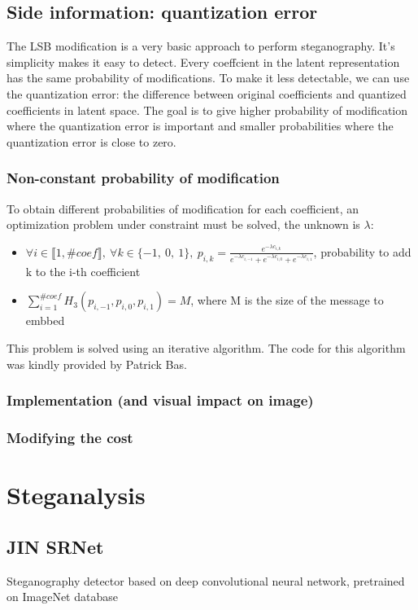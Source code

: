 \documentclass[12pt]{article}
\begin{document}
\subsection{Side information: quantization error}
The LSB modification is a very basic approach to perform steganography. It's simplicity makes it easy to detect. Every coeffcient in the latent representation has the same probability of modifications. To make it less detectable, we can use the quantization error: the difference between original coefficients and quantized coefficients in latent space. The goal is to give higher probability of modification where the quantization error is important and smaller probabilities where the quantization error is close to zero.  
\subsubsection{Non-constant probability of modification}
To obtain different probabilities of modification for each coefficient, an optimization problem under constraint must be solved, the unknown is $\lambda$:
\begin{itemize}
    \item $\forall i \in \llbracket 1, \# coef \rrbracket,\ \forall k \in \{-1,\ 0,\ 1 \},\ p_{i,k} = \frac{e^{-\lambda c_{i,k}}}{e^{-\lambda c_{i,-1}} + e^{-\lambda c_{i,0}} + e^{-\lambda c_{i,1}}}$, probability to add k to the i-th coefficient
    \item $\displaystyle\sum_{i=1}^{\# coef}{H_3(p_{i,-1},p_{i,0},p_{i,1})} = M$, where M is the size of the message to embbed
\end{itemize}
This problem is solved using an iterative algorithm. The code for this algorithm was kindly provided by Patrick Bas.

\subsubsection{Implementation (and visual impact on image)}
\subsubsection{Modifying the cost}

\section{Steganalysis}
\subsection{JIN SRNet}
Steganography detector based on deep convolutional neural network, pretrained on ImageNet database
\end{document}
